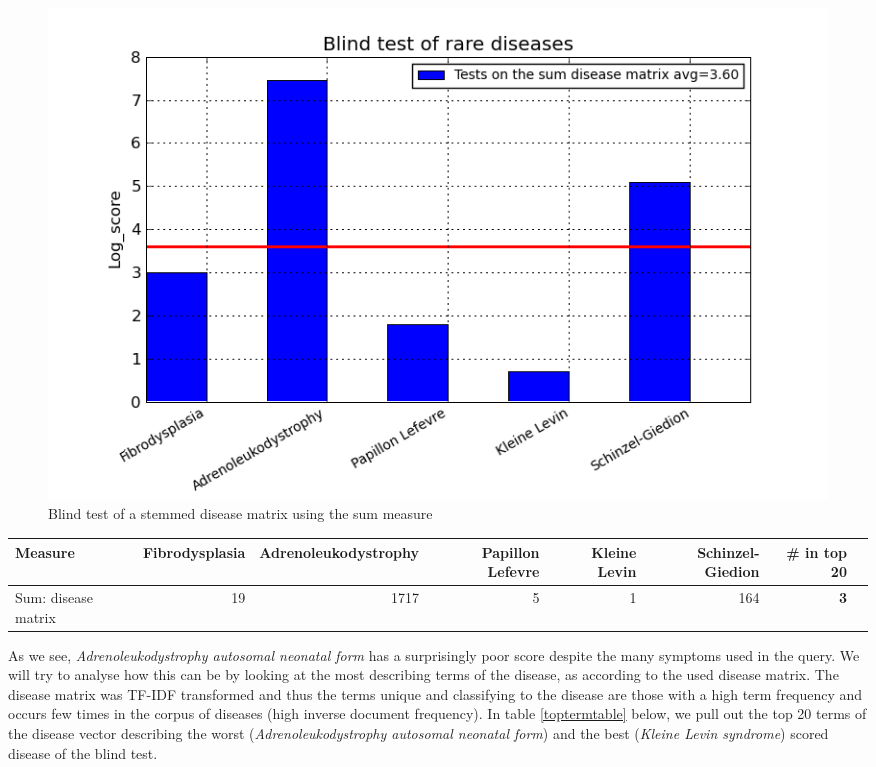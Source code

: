 \begin{figure}[H]
  \caption{Blind test of a stemmed disease matrix using the sum measure}
  \begin{center}
    \includegraphics[width=1\textwidth]{barcharts/blind_test.png}
  \end{center}
  \label{blind_test_table}
\end{figure}

\begin{table}[H]
\begin{tiny}
  \begin{tabular}{|l|r|r|r|r|r|r|r|}
    \hline
    Measure & Fibrodysplasia & Adrenoleukodystrophy & Papillon Lefevre & Kleine Levin & Schinzel-Giedion & \scriptsize{\textbf{\# in top 20}}\\
    \hline
    Sum: disease matrix & 19 & 1717 & 5 & 1 & 164 & \scriptsize{\textbf{3}} \\
    \hline
    \end{tabular}
\end{tiny}
\end{table}



As we see, \textit{Adrenoleukodystrophy autosomal neonatal form} has a surprisingly poor score despite the many symptoms used in the query.
We will try to analyse how this can be by looking at the most describing terms of the disease, as according to the used 
disease matrix. The disease matrix was TF-IDF transformed and thus the terms unique and classifying to the disease are those with a high term 
frequency and occurs few times in the corpus of diseases (high inverse document frequency). In table \ref{toptermtable} below, we pull out the 
top 20 terms of the disease vector describing the worst (\textit{Adrenoleukodystrophy autosomal neonatal form}) and the best (\textit{Kleine Levin syndrome}) 
scored disease of the blind test.

